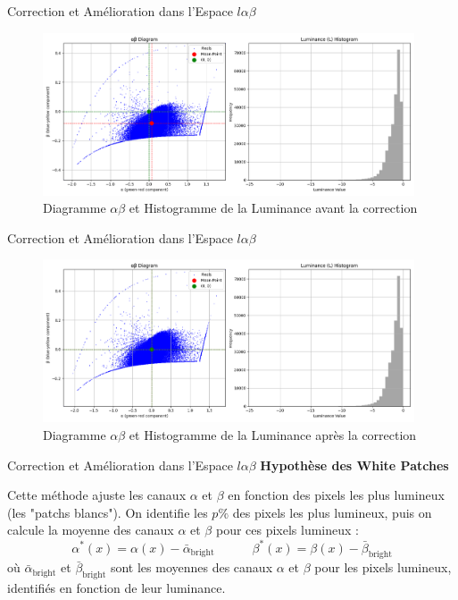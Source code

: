 \documentclass[8pt,a4paper]{beamer}
\numberwithin{figure}{section}
\begin{document}
\begin{frame}{Correction et Amélioration dans l'Espace \( l\alpha\beta \)}
\begin{figure}[h!]
\begin{center}
\includegraphics[width=11cm]{image007.png}
\end{center}
\label{figure3.2}
\caption{Diagramme $\alpha\beta$ et Histogramme de la Luminance avant la correction}
\end{figure}
\end{frame}

\begin{frame}{Correction et Amélioration dans l'Espace \( l\alpha\beta \)}
\begin{figure}[h!]
\begin{center}
\includegraphics[width=11cm]{image008.png}
\end{center}
\label{figure3.3}
\caption{Diagramme $\alpha\beta$ et Histogramme de la Luminance après la correction}
\end{figure}
\end{frame}

\begin{frame}{Correction et Amélioration dans l'Espace \( l\alpha\beta \)}
\textbf{Hypothèse des White Patches}
\vspace{3mm}  
\par Cette méthode ajuste les canaux \( \alpha \) et \( \beta \) en fonction des pixels les plus lumineux (les "patchs blancs"). On identifie les \( p\% \) des pixels les plus lumineux, puis on calcule la moyenne des canaux \( \alpha \) et \( \beta \) pour ces pixels lumineux :
   \[
   \alpha^*(x) = \alpha(x) - \bar{\alpha}_{\text{bright}} \quad\quad\quad \beta^*(x) = \beta(x) - \bar{\beta}_{\text{bright}}
   \]
   où \( \bar{\alpha}_{\text{bright}} \) et \( \bar{\beta}_{\text{bright}} \) sont les moyennes des canaux \( \alpha \) et \( \beta \) pour les pixels lumineux, identifiés en fonction de leur luminance.
\end{frame}
\end{document}
